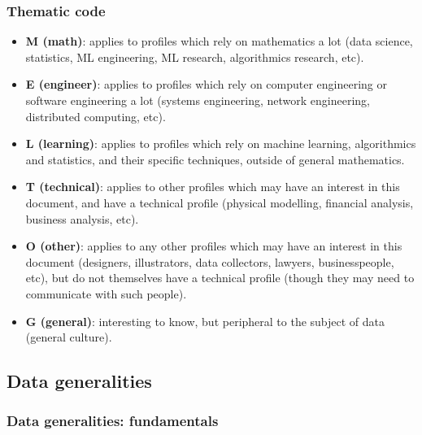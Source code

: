 \documentclass{article}
\begin{document}
\subsubsection*{Thematic code}

\begin{itemize}
	\item \textbf{M (math)}: applies to profiles which rely on mathematics a lot (data science, statistics, ML engineering, ML research, algorithmics research, etc).
	\item \textbf{E (engineer)}: applies to profiles which rely on computer engineering or software engineering a lot (systems engineering, network engineering, distributed computing, etc).
	\item \textbf{L (learning)}: applies to profiles which rely on machine learning, algorithmics and statistics, and their specific techniques, outside of general mathematics.
	\item \textbf{T (technical)}: applies to other profiles which may have an interest in this document, and have a technical profile (physical modelling, financial analysis, business analysis, etc).
	\item \textbf{O (other)}: applies to any other profiles which may have an interest in this document (designers, illustrators, data collectors, lawyers, businesspeople, etc), but do not themselves have a technical profile (though they may need to communicate with such people).
	\item \textbf{G (general)}: interesting to know, but peripheral to the subject of data (general culture).
\end{itemize}




\subsection*{Data generalities}

\subsubsection*{Data generalities: fundamentals}
\end{document}

